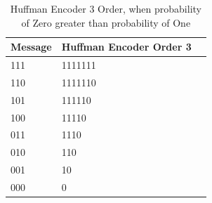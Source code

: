 \begin{refsection}
\begin{table}[H]
\centering
\caption{Huffman Encoder 3 Order, when probability of Zero greater than probability of One}
\label{tb:hufmmanencoder5}
\begin{tabular}{|l|l|l|}
\hline
\textbf{Message}                      & \textbf{Huffman Encoder Order 3}                                       \\ \hline
111                 & 1111111                                                          \\ \hline
110                 & 1111110                                                          \\ \hline
101                 & 111110                                                         \\ \hline
100                 & 11110                                                   \\ \hline
011                 & 1110                                                          \\ \hline
010                 & 110                                                          \\ \hline
001                 & 10                                                         \\ \hline
000                 & 0                                                         \\ \hline
\end{tabular}
\end{table}




\end{refsection}
